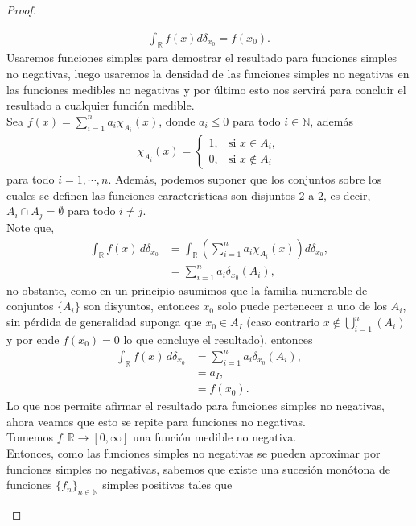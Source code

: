 \begin{enumerate}
\begin{proof}
\begin{enumerate}
      \begin{align*}
        \int_{\mathbb{R}} f(x) d \delta_{x_0}=f\left(x_0\right).
      \end{align*}
      Usaremos funciones simples para demostrar el resultado para funciones simples no negativas, luego usaremos la densidad de las funciones simples no negativas en las funciones medibles no negativas y por último esto nos servirá para concluir el resultado a cualquier función medible.\\
      Sea $f(x) = \sum_{i=1}^n a_i \chi_{A_i}(x)$, donde $a_i\leq 0$ para todo $i\in\mathbb{N}$, además 
      \begin{align*}
        \chi_{A_i}(x) = \begin{cases} 
          1, & \text{si } x \in A_i,\\
          0, & \text{si } x \notin A_i
        \end{cases}
      \end{align*}
      para todo $i = 1,\cdots,n$. Además, podemos suponer que los conjuntos sobre los cuales se definen las funciones características son disjuntos $2$ a $2$, es decir, $A_i \cap A_j = \emptyset$ para todo $i \neq j$.\\
      Note que,
      \begin{align*}
        \int_{\mathbb{R}} f(x) \, d\delta_{x_0} &= \int_{\mathbb{R}} \left( \sum_{i=1}^n a_i \chi_{A_i}(x) \right) d\delta_{x_0},\\ 
        &= \sum_{i=1}^n a_i \delta_{x_0}(A_i),
      \end{align*}
      no obstante, como en un principio asumimos que la familia numerable de conjuntos $\{A_i\}$ son disyuntos, entonces $x_0$ solo puede pertenecer a uno de los $A_i$, sin pérdida de generalidad suponga que $x_0\in A_{I}$ (caso contrario $x\notin \bigcup_{i=1}^{n}(A_i)$ y por ende $f(x_0)=0$ lo que concluye el resultado), entonces
      \begin{align*}
        \int_{\mathbb{R}} f(x) \, d\delta_{x_0} &= \sum_{i=1}^n a_i \delta_{x_0}(A_i),\\
        &= a_I,\\
        &= f(x_0).
      \end{align*}
      Lo que nos permite afirmar el resultado para funciones simples no negativas, ahora veamos que esto se repite para funciones no negativas.\\
      Tomemos $f:\mathbb{R}\to[0, \infty]$ una función medible no negativa.\\ Entonces, como las funciones simples no negativas se pueden aproximar por funciones simples no negativas, sabemos que existe una sucesión monótona de funciones $\{f_n\}_{n\in\mathbb{N}}$ simples positivas tales que

\end{enumerate}
\end{proof}
\end{enumerate}
